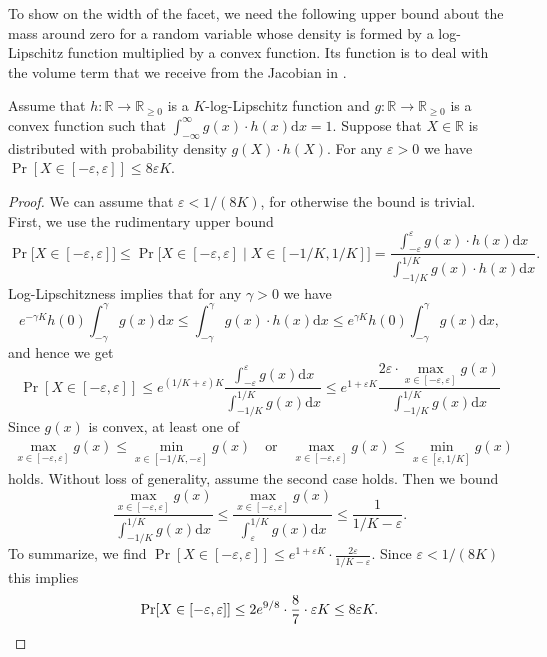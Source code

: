 \documentclass{article}\usepackage[a4paper,margin=20mm]{geometry}
\newcommand{\R}{\mathbb R}
\newcommand{\eps}{\varepsilon} %
\begin{document}
To show  on the width of the facet, we need the following upper bound about the mass around zero for a random variable whose density is formed by a log-Lipschitz function multiplied by a convex function.
Its function is to deal with the volume term that we receive from the Jacobian in .

\begin{lemma}\label{lem:integrals}
    Assume that $h : \R \to \R_{\geq 0}$ is a $K$-log-Lipschitz function
    and $g : \R \to \R_{\geq 0}$ is a convex function such that
    $\int_{-\infty}^\infty g(x) \cdot h(x) \mathrm d x = 1$.
    Suppose that $X \in \R$ is distributed with probability density $g(X)\cdot h(X)$.
    For any $\eps > 0$ we have
    $\Pr[X \in [-\eps, \eps]] \leq 8 \eps K$.
\end{lemma}
\begin{proof}
    We can assume that $\eps < 1/(8K)$, for otherwise the bound is trivial.
    First, we use the rudimentary upper bound
    \[
        \Pr\big[X \in [-\eps,\eps] \big]  \leq \Pr\big[X \in [-\eps, \eps] \mid X \in [-1/K,1/K] \big]
            = \frac
                {\int_{-\eps}^{\eps} g(x) \cdot h(x) \mathrm d x}
                {\int_{-1/K}^{1/K} g(x) \cdot h(x) \mathrm d x}.
    \]
    Log-Lipschitzness implies that for any $\gamma > 0$ we have
    \[
        e^{-\gamma K} h(0) \int_{-\gamma}^\gamma g(x) \mathrm d x
        \leq
        \int_{-\gamma}^\gamma g(x) \cdot h(x) \mathrm d x
        \leq
        e^{\gamma K} h(0) \int_{-\gamma}^\gamma g(x) \mathrm d x,
    \]
    and hence we get
    \[
        \Pr[X \in [-\eps, \eps]]
        \leq e^{(1/K + \eps) K} \frac
        {\int_{-\eps}^{\eps} g(x) \mathrm d x}
        {\int_{-1/K}^{1/K} g(x) \mathrm d x}
        \leq e^{1 + \eps K} \frac
        {2\eps \cdot \max_{x \in [-\eps, \eps]} g(x)}
        {\int_{-1/K}^{1/K} g(x) \mathrm d x}
    \]
    Since $g(x)$ is convex, at least one of
    \begin{align*}
        \max_{x \in [-\eps, \eps]} g(x) \leq \min_{x \in [-1/K, -\eps]} g(x)
        \quad \text{or} \quad
        \max_{x \in [-\eps, \eps]} g(x) \leq \min_{x \in [\eps, 1/K]} g(x)
    \end{align*}
    holds. Without loss of generality, assume the second case holds. Then we bound
    \[
        \frac
            {\max_{x \in [-\eps, \eps]} g(x)}
            {\int_{-1/K}^{1/K} g(x) \mathrm d x}
        \leq
        \frac
            {\max_{x \in [-\eps, \eps]} g(x)}
            {\int_{\eps}^{1/K} g(x) \mathrm d x}
        \leq \frac{1}{1/K - \eps}.
    \]
    To summarize, we find
        $\Pr[ X \in [-\eps, \eps]]
        \leq
        e^{1+\eps K} \cdot \frac{2\eps}{1/K - \eps}$.
    Since $\eps < 1/(8K)$ this implies
    \[
        \Pr[X \in [-\eps,\eps]] \leq 2 e^{9/8} \cdot \frac 8 7 \cdot \eps K \leq 8\eps K .\qedhere
    \]
\end{proof}
\end{document}
